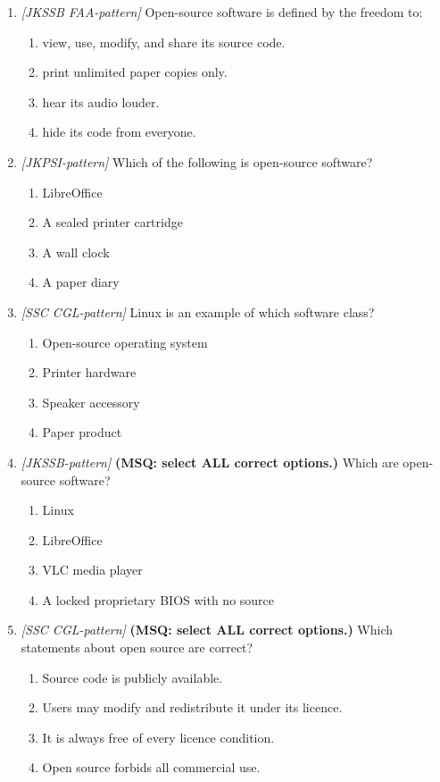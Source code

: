\documentclass[11pt]{article}
\begin{document}
\begin{enumerate}[label=\textbf{Q\arabic*.}, leftmargin=*]
\item \textit{[JKSSB FAA-pattern]} Open-source software is defined by the freedom to:
  \begin{enumerate}[label=\Alph*.]
    \item view, use, modify, and share its source code.
    \item print unlimited paper copies only.
    \item hear its audio louder.
    \item hide its code from everyone.
  \end{enumerate}
\item \textit{[JKPSI-pattern]} Which of the following is open-source software?
  \begin{enumerate}[label=\Alph*.]
    \item LibreOffice
    \item A sealed printer cartridge
    \item A wall clock
    \item A paper diary
  \end{enumerate}
\item \textit{[SSC CGL-pattern]} Linux is an example of which software class?
  \begin{enumerate}[label=\Alph*.]
    \item Open-source operating system
    \item Printer hardware
    \item Speaker accessory
    \item Paper product
  \end{enumerate}
\item \textit{[JKSSB-pattern]} \textbf{(MSQ: select ALL correct options.)} Which are open-source software?
  \begin{enumerate}[label=\Alph*.]
    \item Linux
    \item LibreOffice
    \item VLC media player
    \item A locked proprietary BIOS with no source
  \end{enumerate}
\item \textit{[SSC CGL-pattern]} \textbf{(MSQ: select ALL correct options.)} Which statements about open source are correct?
  \begin{enumerate}[label=\Alph*.]
    \item Source code is publicly available.
    \item Users may modify and redistribute it under its licence.
    \item It is always free of every licence condition.
    \item Open source forbids all commercial use.
  \end{enumerate}
\end{enumerate}
\def\JKSSBLessonID{45}\def\JKSSBAnswers{0}
\end{document}
